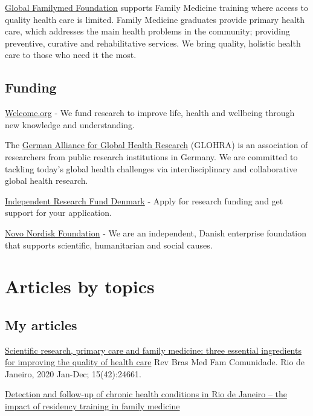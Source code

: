 \documentclass[
  letterpaper,
  DIV=11,
  numbers=noendperiod]{scrreprt}
\begin{document}
\href{https://www.globalfamilymed.org/}{Global Familymed Foundation}
supports Family Medicine training where access to quality health care is
limited. Family Medicine graduates provide primary health care, which
addresses the main health problems in the community; providing
preventive, curative and rehabilitative services. We bring quality,
holistic health care to those who need it the most.

\section{Funding}\label{funding}

\href{https://wellcome.org/research-funding}{Welcome.org} - We fund
research to improve life, health and wellbeing through new knowledge and
understanding.

The \href{https://www.globalhealth.de/about/}{German Alliance for Global
Health Research} (GLOHRA) is an association of researchers from public
research institutions in Germany. We are committed to tackling today's
global health challenges via interdisciplinary and collaborative global
health research.

\href{https://dff.dk/en/apply-for-funding/}{Independent Research Fund
Denmark} - Apply for research funding and get support for your
application.

\href{https://novonordiskfonden.dk/en/}{Novo Nordisk Foundation} - We
are an independent, Danish enterprise foundation that supports
scientific, humanitarian and social causes.


\chapter{Articles by topics}\label{articles-by-topics}

\section{My articles}\label{my-articles}

\href{https://rbmfc.org.br/rbmfc/article/view/2466/1565}{Scientific
research, primary care and family medicine: three essential ingredients
for improving the quality of health care} Rev Bras Med Fam Comunidade.
Rio de Janeiro, 2020 Jan-Dec; 15(42):24661.

\href{https://bmcprimcare.biomedcentral.com/articles/10.1186/s12875-021-01542-5}{Detection
and follow-up of chronic health conditions in Rio de Janeiro -- the
impact of residency training in family medicine}
\end{document}
